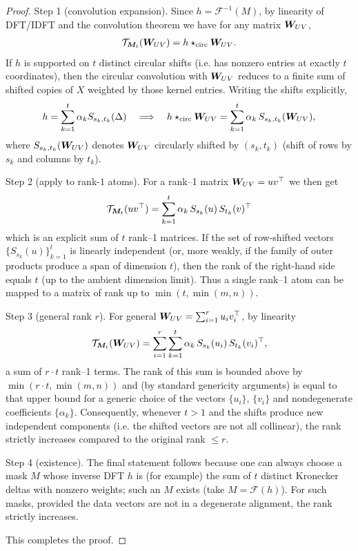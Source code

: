 \documentclass{article}
\theoremstyle{plain}
\theoremstyle{definition}
\theoremstyle{remark}
\begin{document}
\begin{proof}
Step 1 (convolution expansion). Since $h=\mathcal{F}^{-1}(M)$, by linearity of DFT/IDFT and the convolution theorem we have for any matrix ${\bm{W}}_{UV}$,
\begin{align}
\mathcal{T}_{{\bm{M}}_t}({\bm{W}}_{UV}) = h \star_{\mathrm{circ}} {\bm{W}}_{UV}.
\end{align}
If $h$ is supported on $t$ distinct circular shifts (i.e. has nonzero entries at exactly $t$ coordinates), then the circular convolution with ${\bm{W}}_{UV}$ reduces to a finite sum of shifted copies of $X$ weighted by those kernel entries. Writing the shifts explicitly,
\begin{align}
h=\sum_{k=1}^t \alpha_k S_{s_k,t_k}(\Delta)
\quad\Longrightarrow\quad
h\star_{\mathrm{circ}} {\bm{W}}_{UV} = \sum_{k=1}^t \alpha_k\, S_{s_k,t_k}({\bm{W}}_{UV}),
\end{align}
where $S_{s_k,t_k}({\bm{W}}_{UV})$ denotes ${\bm{W}}_{UV}$ circularly shifted by $(s_k,t_k)$ (shift of rows by $s_k$ and columns by $t_k$).

Step 2 (apply to rank-$1$ atoms). For a rank--1 matrix ${\bm{W}}_{UV} = u v^\top$ we then get
\begin{align}
\mathcal{T}_{{\bm{M}}_t}(u v^\top) = \sum_{k=1}^t \alpha_k \, S_{s_k}(u)\,S_{t_k}(v)^\top
\end{align}
which is an explicit sum of $t$ rank--1 matrices. If the set of row-shifted vectors $\{S_{s_k}(u)\}_{k=1}^t$ is linearly independent (or, more weakly, if the family of outer products produce a span of dimension $t$), then the rank of the right-hand side equals $t$ (up to the ambient dimension limit). Thus a single rank--1 atom can be mapped to a matrix of rank up to $\min(t,\min(m,n))$.

Step 3 (general rank $r$). For general ${\bm{W}}_{UV}=\sum_{i=1}^r u_i v_i^\top$, by linearity
\begin{align}
\mathcal{T}_{{\bm{M}}_t}({\bm{W}}_{UV}) = \sum_{i=1}^r \sum_{k=1}^t \alpha_k \, S_{s_k}(u_i)\,S_{t_k}(v_i)^\top,
\end{align}
a sum of $r\cdot t$ rank--1 terms. The rank of this sum is bounded above by $\min(r\cdot t,\min(m,n))$ and (by standard genericity arguments) is equal to that upper bound for a generic choice of the vectors $\{u_i\}$, $\{v_i\}$ and nondegenerate coefficients $\{\alpha_k\}$. Consequently, whenever $t>1$ and the shifts produce new independent components (i.e. the shifted vectors are not all collinear), the rank strictly increases compared to the original rank $\le r$.

Step 4 (existence). The final statement follows because one can always choose a mask $M$ whose inverse DFT $h$ is (for example) the sum of $t$ distinct Kronecker deltas with nonzero weights; such an $M$ exists (take $M=\mathcal{F}(h)$). For such masks, provided the data vectors are not in a degenerate alignment, the rank strictly increases.

This completes the proof.
\end{proof}
\end{document}

